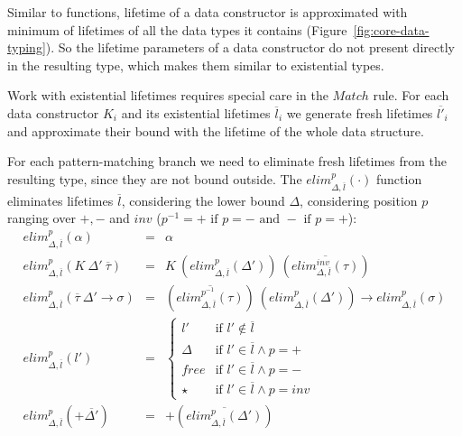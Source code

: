 \documentclass[11pt]{article}
\newcommand{\ap}{~}
\begin{document}
    Similar to functions, lifetime of a data constructor is approximated with minimum of lifetimes of all the data types it contains (Figure\ \ref{fig:core-data-typing}).
    So the lifetime parameters of a data constructor do not present directly in the resulting type, which makes them similar to existential types. %

    Work with existential lifetimes requires special care in the $Match$ rule.
    For each data constructor $K_i$ and its existential lifetimes $\overline{l}_i$ we generate fresh lifetimes $\overline{l'}_i$ and approximate their bound with the lifetime of the whole data structure.

    For each pattern-matching branch we need to eliminate fresh lifetimes from the resulting type, since they are not bound outside. %
    The $elim_{\Delta, \overline{l}}^p(\cdot)$ function eliminates lifetimes $\overline{l}$, considering the lower bound $\Delta$, considering position $p$ ranging over $+, -$ and $inv$ ($p^{-1} = + \text{ if } p = - \text{ and } - \text{ if } p = +$):
    \[
        \begin{array}{lll}
            elim_{\Delta, \overline{l}}^p(\alpha) & = & \alpha \\
            elim_{\Delta, \overline{l}}^p(K\ap \Delta'\ap\overline{\tau}) & = & K\ap \left( elim_{\Delta, \overline{l}}^p(\Delta') \right)\ap\left( \overline{elim_{\Delta, \overline{l}}^{inv}(\tau)} \right) \\
            elim_{\Delta, \overline{l}}^p(\overline{\tau}~\Delta'\to\sigma) & = & \left( \overline{elim_{\Delta, \overline{l}}^{p^{-1}}(\tau)} \right)~\left( elim_{\Delta, \overline{l}}^p(\Delta') \right)\to elim_{\Delta, \overline{l}}^{p}(\sigma) \\
            elim_{\Delta, \overline{l}}^{p}(l') & = &
            \begin{cases}
                l'     & \text{if } l' \not\in\overline{l} \\
                \Delta & \text{if } l' \in \overline{l} \land p = + \\
                free   & \text{if } l' \in \overline{l} \land p = - \\
                \star  & \text{if } l' \in \overline{l} \land p = inv
            \end{cases} \\
            elim_{\Delta, \overline{l}}^{p}(+\overline{\Delta'}) & = & +\left( \overline{elim_{\Delta, \overline{l}}^{p}(\Delta')} \right)
        \end{array}
    \]
\end{document}
